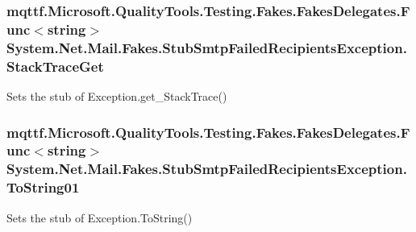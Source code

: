 \hypertarget{class_system_1_1_net_1_1_mail_1_1_fakes_1_1_stub_smtp_failed_recipients_exception_a9a5abf28d50c619832044ce43bd3d785}{
\subsubsection[{Stack\-Trace\-Get}]{\setlength{\rightskip}{0pt plus 5cm}mqttf.\-Microsoft.\-Quality\-Tools.\-Testing.\-Fakes.\-Fakes\-Delegates.\-Func$<$string$>$ System.\-Net.\-Mail.\-Fakes.\-Stub\-Smtp\-Failed\-Recipients\-Exception.\-Stack\-Trace\-Get}}\label{class_system_1_1_net_1_1_mail_1_1_fakes_1_1_stub_smtp_failed_recipients_exception_a9a5abf28d50c619832044ce43bd3d785}


Sets the stub of Exception.\-get\-\_\-\-Stack\-Trace()

\hypertarget{class_system_1_1_net_1_1_mail_1_1_fakes_1_1_stub_smtp_failed_recipients_exception_a2ba3963e7ef710c65ac0356e854692c0}{
\subsubsection[{To\-String01}]{\setlength{\rightskip}{0pt plus 5cm}mqttf.\-Microsoft.\-Quality\-Tools.\-Testing.\-Fakes.\-Fakes\-Delegates.\-Func$<$string$>$ System.\-Net.\-Mail.\-Fakes.\-Stub\-Smtp\-Failed\-Recipients\-Exception.\-To\-String01}}\label{class_system_1_1_net_1_1_mail_1_1_fakes_1_1_stub_smtp_failed_recipients_exception_a2ba3963e7ef710c65ac0356e854692c0}


Sets the stub of Exception.\-To\-String()



